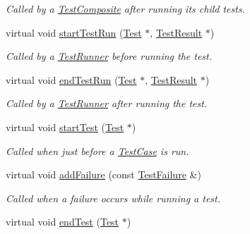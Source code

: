 \begin{DoxyCompactItemize}
\begin{DoxyCompactList}\small\item\em Called by a \hyperlink{class_test_composite}{Test\+Composite} after running its child tests. \end{DoxyCompactList}\item 
virtual void \hyperlink{class_test_listener_a263428abdf29b2a7123af4096771925e}{start\+Test\+Run} (\hyperlink{class_test}{Test} $\ast$, \hyperlink{class_test_result}{Test\+Result} $\ast$)
\begin{DoxyCompactList}\small\item\em Called by a \hyperlink{class_test_runner}{Test\+Runner} before running the test. \end{DoxyCompactList}\item 
virtual void \hyperlink{class_test_listener_a0411708032f688f6ec234bcc5e089289}{end\+Test\+Run} (\hyperlink{class_test}{Test} $\ast$, \hyperlink{class_test_result}{Test\+Result} $\ast$)
\begin{DoxyCompactList}\small\item\em Called by a \hyperlink{class_test_runner}{Test\+Runner} after running the test. \end{DoxyCompactList}\item 
\hypertarget{class_test_listener_a5546d4420e7412234915113b1ea5ad77}{virtual void \hyperlink{class_test_listener_a5546d4420e7412234915113b1ea5ad77}{start\+Test} (\hyperlink{class_test}{Test} $\ast$)}\label{class_test_listener_a5546d4420e7412234915113b1ea5ad77}

\begin{DoxyCompactList}\small\item\em Called when just before a \hyperlink{class_test_case}{Test\+Case} is run. \end{DoxyCompactList}\item 
virtual void \hyperlink{class_test_listener_a103216a5814c907f7b752b969477e765}{add\+Failure} (const \hyperlink{class_test_failure}{Test\+Failure} \&)
\begin{DoxyCompactList}\small\item\em Called when a failure occurs while running a test. \end{DoxyCompactList}\item 
\hypertarget{class_test_listener_ae8ccd0f55dd9aa7eafded05ba14f9ac6}{virtual void \hyperlink{class_test_listener_ae8ccd0f55dd9aa7eafded05ba14f9ac6}{end\+Test} (\hyperlink{class_test}{Test} $\ast$)}\label{class_test_listener_ae8ccd0f55dd9aa7eafded05ba14f9ac6}


\end{DoxyCompactItemize}
